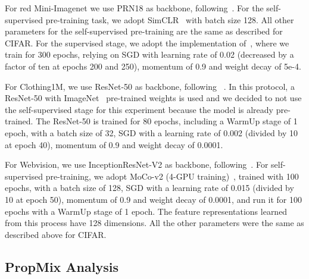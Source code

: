 \documentclass{bmvc2k}
\begin{document}
For red Mini-Imagenet we use PRN18 as backbone, following~\citep{FaMUS}. For the self-supervised pre-training task, we adopt SimCLR~\citep{SimCLR} with batch size 128. All other parameters for the self-supervised pre-training are the same as described for CIFAR. For the supervised stage, we adopt the implementation of~\citep{FaMUS}, where we train for 300 epochs,  relying on SGD with learning rate of 0.02 (decreased by a factor of ten at epochs 200 and 250), momentum of 0.9 and weight decay of 5e-4. 

For Clothing1M, we use ResNet-50 as backbone, following ~\citep{DivideMix}. In this protocol, a ResNet-50 with ImageNet~\citep{deng2009imagenet} pre-trained weights is used and we decided to not use the self-supervised stage for this experiment because the model is already pre-trained. The ResNet-50 is trained for 80 epochs, including a WarmUp stage of 1 epoch, with a batch size of 32, SGD with a learning rate of 0.002 (divided by 10 at epoch 40), momentum of 0.9 and weight decay of 0.0001.

For Webvision, we use InceptionResNet-V2 as backbone, following~\citep{DivideMix}. For self-supervised pre-training, we adopt MoCo-v2 (4-GPU training)~\citep{MoCoV2}, trained with 100 epochs, with a batch size of 128, SGD with a learning rate of 0.015 (divided by 10 at epoch 50), momentum of 0.9 and weight decay of 0.0001, and run it for 100 epochs with a WarmUp stage of 1 epoch. The feature representations learned from this process have 128 dimensions. All the other parameters were the same as described above for CIFAR. 





\subsection{PropMix Analysis}
\label{sec:analysis} 
\end{document}
